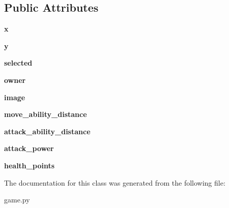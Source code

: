 \subsection*{Public Attributes}
\begin{DoxyCompactItemize}
\item 
\hypertarget{classgame_1_1Character_a24edd8eba429b95871d2aba45a782ed8}{{\bfseries x}}\label{classgame_1_1Character_a24edd8eba429b95871d2aba45a782ed8}

\item 
\hypertarget{classgame_1_1Character_a69b149b26ed88cf5f7c0cb96dd84e8e8}{{\bfseries y}}\label{classgame_1_1Character_a69b149b26ed88cf5f7c0cb96dd84e8e8}

\item 
\hypertarget{classgame_1_1Character_a7c0f72230651ffbe370001fdc55c9e00}{{\bfseries selected}}\label{classgame_1_1Character_a7c0f72230651ffbe370001fdc55c9e00}

\item 
\hypertarget{classgame_1_1Character_a2c9932edc776eb9214bbf1a48398174e}{{\bfseries owner}}\label{classgame_1_1Character_a2c9932edc776eb9214bbf1a48398174e}

\item 
\hypertarget{classgame_1_1Character_ac3f9c3f85636513c19c7865f3a4e0622}{{\bfseries image}}\label{classgame_1_1Character_ac3f9c3f85636513c19c7865f3a4e0622}

\item 
\hypertarget{classgame_1_1Character_a1b4c8be47c49498885f6445bffe6c191}{{\bfseries move\-\_\-ability\-\_\-distance}}\label{classgame_1_1Character_a1b4c8be47c49498885f6445bffe6c191}

\item 
\hypertarget{classgame_1_1Character_aa63dfab6c6341366d7d22dc2bdc48b9f}{{\bfseries attack\-\_\-ability\-\_\-distance}}\label{classgame_1_1Character_aa63dfab6c6341366d7d22dc2bdc48b9f}

\item 
\hypertarget{classgame_1_1Character_a4e53fa5563ec68809d921c8ef91bbcc7}{{\bfseries attack\-\_\-power}}\label{classgame_1_1Character_a4e53fa5563ec68809d921c8ef91bbcc7}

\item 
\hypertarget{classgame_1_1Character_a3b145280dac0ad06df842ec28cd4c559}{{\bfseries health\-\_\-points}}\label{classgame_1_1Character_a3b145280dac0ad06df842ec28cd4c559}

\end{DoxyCompactItemize}


The documentation for this class was generated from the following file\-:\begin{DoxyCompactItemize}
\item 
game.\-py\end{DoxyCompactItemize}
